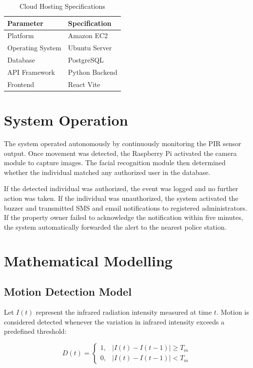 \documentclass[12pt,a4paper,oneside]{report}
\begin{document}
\begin{table}[htbp]
  \centering
  \caption{Cloud Hosting Specifications}
  {\small
  \begin{tabular}{|p{5.00cm}|p{8.00cm}|}
    \hline
    \textbf{Parameter} & \textbf{Specification} \\
    \hline
    Platform            & Amazon EC2 \\
    Operating System    & Ubuntu Server \\
    Database            & PostgreSQL \\
    API Framework       & Python Backend \\
    Frontend            & React Vite \\
    \hline
  \end{tabular}
  }
\end{table}

\section{System Operation}

The system operated autonomously by continuously monitoring the PIR sensor output. Once movement was detected, the Raspberry Pi activated the camera module to capture images. The facial recognition module then determined whether the individual matched any authorized user in the database.

If the detected individual was authorized, the event was logged and no further action was taken. If the individual was unauthorized, the system activated the buzzer and transmitted SMS and email notifications to registered administrators. If the property owner failed to acknowledge the notification within five minutes, the system automatically forwarded the alert to the nearest police station.

\section{Mathematical Modelling}

\subsection{Motion Detection Model}

Let $I(t)$ represent the infrared radiation intensity measured at time $t$. Motion is considered detected whenever the variation in infrared intensity exceeds a predefined threshold:

\begin{equation}
  D(t) = \begin{cases} 1, & |I(t) - I(t-1)| \geq T_m \\ 0, & |I(t) - I(t-1)| < T_m \end{cases}
\end{equation}
\end{document}
